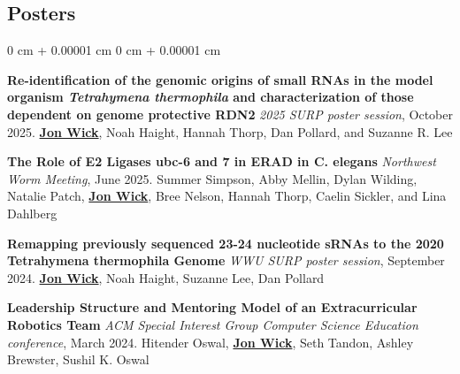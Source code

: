 \documentclass[10pt, article]{article}
\newenvironment{onecolentry}{
    \begin{adjustwidth}{
        0 cm + 0.00001 cm
    }{
        0 cm + 0.00001 cm
    }
}{
    \end{adjustwidth}
} %
\begin{document}
    \begin{samepage}

    \section{Posters}





        \begin{onecolentry}
            \textbf{Re-identification of the genomic origins of small RNAs in the model organism \textit{Tetrahymena thermophila} and characterization of those dependent on genome protective RDN2} \newline
          \textit{2025 SURP poster session}, October 2025.\newline
            \underline{\textbf{Jon Wick}}, Noah Haight, Hannah Thorp, Dan Pollard, and Suzanne R. Lee
         
           \vspace{0.2cm}

           \textbf{The Role of E2 Ligases ubc-6 and 7 in ERAD in C. elegans} \newline
          \textit{Northwest Worm Meeting}, June 2025.\newline
            Summer Simpson, Abby Mellin, Dylan Wilding, Natalie Patch, \underline{\textbf{Jon Wick}}, Bree Nelson, Hannah Thorp, Caelin Sickler, and Lina Dahlberg
         
           \vspace{0.2cm}

          \textbf{Remapping previously sequenced 23-24 nucleotide sRNAs to the 2020 Tetrahymena thermophila Genome}\newline
          \textit{WWU SURP poster session}, September 2024. \newline
          \underline{\textbf{Jon Wick}}, Noah Haight, Suzanne Lee, Dan Pollard

          \vspace{0.2cm}

          \textbf{Leadership Structure and Mentoring Model of an Extracurricular Robotics Team} \newline
          \textit{ACM Special Interest Group Computer Science Education conference}, March 2024.\newline
          Hitender Oswal, \underline{\textbf{Jon Wick}}, Seth Tandon, Ashley Brewster, Sushil K. Oswal




\end{onecolentry}
\end{samepage}
\end{document}
